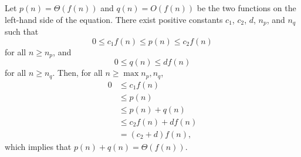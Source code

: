 Let $p(n)=\Theta(f(n))$ and $q(n)=O(f(n))$ be the two functions on the left-hand side of the equation.
There exist positive constants $c_1$, $c_2$, $d$, $n_p$, and $n_q$ such that
\[
    0 \le c_1f(n) \le p(n) \le c_2f(n)
\]
for all $n\ge n_p$, and
\[
    0 \le q(n) \le df(n)
\]
for all $n\ge n_q$.
Then, for all $n\ge\max{n_p,n_q}$,
\begin{align*}
    0 &\le c_1f(n) \\
    &\le p(n) \\
    &\le p(n)+q(n) \\
    &\le c_2f(n)+df(n) \\
    &= (c_2+d)f(n),
\end{align*}
which implies that $p(n)+q(n)=\Theta(f(n))$.

